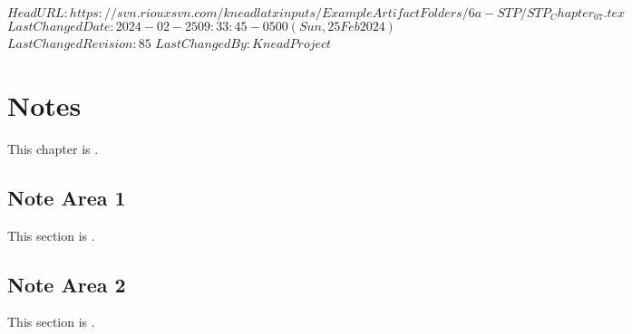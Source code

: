 \svnidlong
{$HeadURL: https://svn.riouxsvn.com/kneadlatxinputs/ExampleArtifactFolders/6a-STP/STP_Chapter_07.tex $}
{$LastChangedDate: 2024-02-25 09:33:45 -0500 (Sun, 25 Feb 2024) $}
{$LastChangedRevision: 85 $}
{$LastChangedBy: KneadProject $}

\chapter{Notes}
\label{loc:Notes}
% 

This chapter is \TBD.

\section{Note Area 1}
\label{loc:Notes_1}
% 

This section is \TBD.

\section{Note Area 2}
\label{loc:Notes_2}
% 

This section is \TBD.